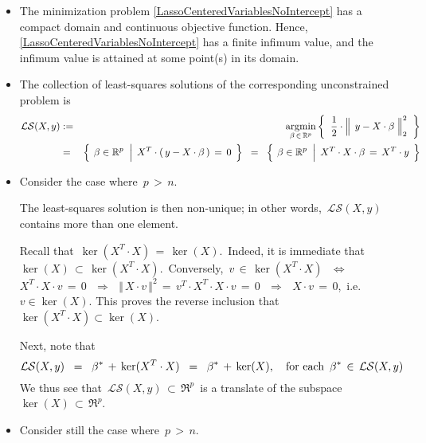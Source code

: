 \begin{itemize}
\item
	The minimization problem \eqref{LassoCenteredVariablesNoIntercept}
	has a compact domain and continuous objective function.
	Hence, \eqref{LassoCenteredVariablesNoIntercept} has a finite infimum value,
	and the infimum value is attained at some point(s) in its domain.
\item
	The collection of least-squares solutions of the corresponding unconstrained problem is
	\begin{eqnarray*}
	\mathcal{LS}(X,y)
	& := &
		\underset{\beta\,\in\,\Re^{p}}{\argmin}
		\left\{\;\;
			\dfrac{1}{2}
			\cdot
			\left\Vert\;\, y \overset{{\color{white}.}}{-} X\cdot\beta \;\right\Vert_{2}^{2}
			\;\;\right\}
	\\
	& = &
		\left\{\;
			\left.
			\overset{{\color{white}.}}{\beta} \in \Re^{p}
			\;\;\right\vert\;
			X^{T} \cdot (\,y - X\cdot\beta\,) \,=\, 0
			\,\;\right\}
		\;\; = \;\;
		\left\{\;
			\left.
			\overset{{\color{white}.}}{\beta} \in \Re^{p}
			\;\;\right\vert\;
			X^{T} \cdot X \cdot \beta \, = \, X^{T} \cdot y
			\,\;\right\}
	\end{eqnarray*}
\item
	Consider the case where \,{\color{red}$p \,>\, n$}.
	
	\vskip 0.2cm
	The least-squares solution is then non-unique;
	in other words, \,$\mathcal{LS}(X,y)$\, contains more than one element.

	\vskip 0.2cm
	Recall that
	\,$\ker(X^{T} \cdot X) \,=\, \ker(X)$.\,
	Indeed, it is immediate that
	\,$\ker(X) \,\subset\, \ker(X^{T} \cdot X)$.\,
	Conversely, \,$v \,\in\, \ker(X^{T} \cdot X)$\,
	\,$\Longleftrightarrow$\, \,$X^{T} \cdot X \cdot v \,=\, 0$\,
	\,$\Longrightarrow$\, \,$\Vert\,X \cdot v\,\Vert^{2} \,=\, v^{T} \cdot X^{T} \cdot X \cdot v \,=\, 0$\,
	\,$\Longrightarrow$\, \,$X \cdot v \,=\, 0$,\,
	i.e. \,$v \in \ker(X)$.
	This proves the reverse inclusion that
	\,$\ker(X^{T} \cdot X) \subset \ker(X)$.

	\vskip 0.2cm
	Next, note that
	\begin{equation*}
	\mathcal{LS}(X,y)
	\;\; = \;\;
		\beta^{*} \,+\, \ker(X^{T}\cdot X)
	\;\; = \;\;
		\beta^{*} \,+\, \ker(X),
	\quad
	\textnormal{for each \,$\beta^{*} \,\in\, \mathcal{LS}(X,y)$}
	\end{equation*}
	We thus see that
	\,{\color{red}$\mathcal{LS}(X,y) \,\subset\, \Re^{p}$\,
	is a translate of the subspace
	\,$\ker(X) \,\subset\, \Re^{p}$.}
	
\item
	Consider still the case where \,{\color{red}$p \,>\, n$}.
	

\end{itemize}
